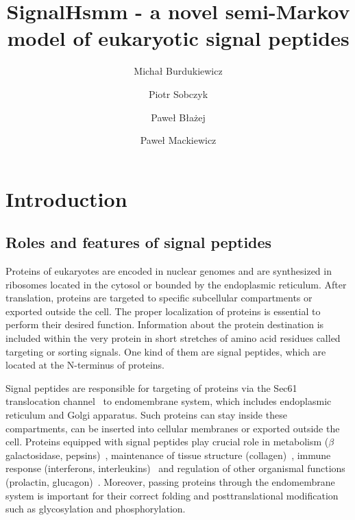 \documentclass[fleqn,10pt,twoside]{gcb15submission}
\title{SignalHsmm - a novel semi-Markov model of eukaryotic signal peptides}
\author[1]{Micha\l{}  Burdukiewicz}
\author[2]{Piotr Sobczyk}
\author[1]{Pawe\l{} B\l{}a\.{z}ej}
\author[1]{Pawe\l{} Mackiewicz}
\affil[1]{University of Wroc\l{}aw, Department of Genomics, Poland}
\affil[2]{Wroc\l{}aw University of Technology, Department of Mathematics, Poland}
\begin{document}
\flushbottom
\maketitle
\thispagestyle{empty}


\section*{Introduction}

\subsection*{Roles and features of signal peptides}

Proteins of eukaryotes are encoded in nuclear genomes and are synthesized in ribosomes located in the cytosol or bounded by the endoplasmic reticulum. After translation, proteins are targeted to specific subcellular compartments or exported outside the cell. The proper localization of proteins is essential to perform their desired function. Information about the protein destination is included within the very protein in short stretches of amino acid residues called targeting or sorting signals. One kind of them are signal peptides, which are located at the N-terminus of proteins.

Signal peptides are responsible for targeting of proteins via the Sec61 translocation channel~\citep{2007rapoportprotein} to endomembrane system, which includes endoplasmic reticulum and Golgi apparatus. Such proteins can stay inside these compartments, can be inserted into cellular membranes or exported outside the cell. Proteins equipped with signal peptides play crucial role in metabolism ($\beta$ galactosidase, pepsins)~\citep{1991hofmannmutations}, maintenance of tissue structure (collagen)~\citep{2001chanaberrant}, immune response (interferons, interleukins)~\citep{2005zhangalteration} and regulation of other organismal functions (prolactin, glucagon)~\citep{2010huangrole}. Moreover, passing proteins through the endomembrane system is important for their correct folding and posttranslational modification such as glycosylation and phosphorylation.
\end{document}
